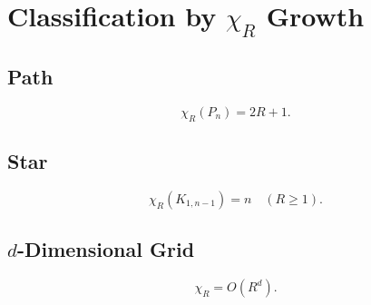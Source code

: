 \section{Classification by $\chi_R$ Growth}

\subsection*{Path}
\[
\chi_R(P_n)=2R+1.
\]

\subsection*{Star}
\[
\chi_R(K_{1,n-1})=n \quad (R\ge1).
\]

\subsection*{$d$-Dimensional Grid}
\[
\chi_R = O(R^d).
\]
